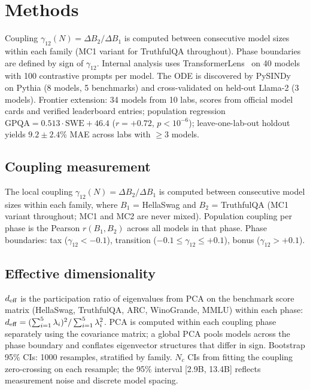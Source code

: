 \documentclass{article}
\begin{document}




\appendix

\section{Methods}

Coupling $\gamma_{12}(N) = \Delta B_2 / \Delta B_1$ is computed between consecutive
model sizes within each family (MC1 variant for TruthfulQA throughout).
Phase boundaries are defined by sign of $\gamma_{12}$.
Internal analysis uses TransformerLens~\cite{nanda2022} on 40 models with 100 contrastive prompts per model.
The ODE is discovered by PySINDy~\cite{brunton2016} on Pythia (8 models, 5 benchmarks)
and cross-validated on held-out Llama-2 (3 models).
Frontier extension: 34 models from 10 labs, scores from official model cards
and verified leaderboard entries;
population regression $\text{GPQA} = 0.513 \cdot \text{SWE} + 46.4$
($r = +0.72$, $p < 10^{-6}$);
leave-one-lab-out holdout yields $9.2 \pm 2.4$\% MAE across labs with $\geq 3$ models.

\subsection{Coupling measurement}
The local coupling $\gamma_{12}(N) = \Delta B_2 / \Delta B_1$ is computed between consecutive
model sizes within each family, where $B_1$ = HellaSwag and $B_2$ = TruthfulQA (MC1 variant throughout;
MC1 and MC2 are never mixed).
Population coupling per phase is the Pearson $r(B_1, B_2)$ across all models in that phase.
Phase boundaries: tax ($\gamma_{12} < -0.1$), transition ($-0.1 \leq \gamma_{12} \leq +0.1$), bonus ($\gamma_{12} > +0.1$).

\subsection{Effective dimensionality}
$d_{\rm eff}$ is the participation ratio of eigenvalues from PCA on the benchmark score matrix
(HellaSwag, TruthfulQA, ARC, WinoGrande, MMLU) within each phase:
$d_{\rm eff} = (\sum_{i=1}^{5} \lambda_i)^2 / \sum_{i=1}^{5} \lambda_i^2$.
PCA is computed within each coupling phase separately using the covariance matrix;
a global PCA pools models across the phase boundary and conflates eigenvector
structures that differ in sign.
Bootstrap 95\% CIs: 1000 resamples, stratified by family.
$N_c$ CIs from fitting the coupling zero-crossing on each resample;
the 95\% interval [2.9B, 13.4B] reflects measurement noise and discrete model spacing.
\end{document}
